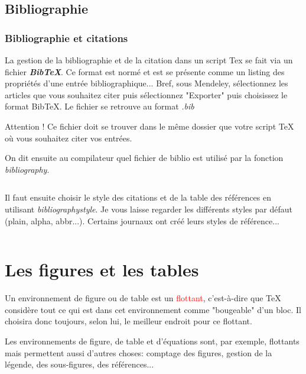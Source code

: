 \documentclass{beamer}
\begin{document}
\subsection[Biblio]{Bibliographie}
\begin{frame}[fragile]
	\frametitle{Bibliographie et citations}
	La gestion de la bibliographie et de la citation dans un script Tex se fait via un fichier \textit{\textbf{BibTeX}}. Ce format est normé et est se présente comme un listing des propriétés d'une entrée bibliographique... Bref, sous Mendeley, sélectionnez les articles que vous souhaitez citer puis sélectionnez "Exporter" puis choisissez le format BibTeX. Le fichier se retrouve au format \textit{.bib}
	\newline

	\alert{Attention !} Ce fichier doit se trouver dans le même dossier que votre script TeX où vous souhaitez citer vos entrées.
\end{frame}

\begin{frame}[fragile]
On dit ensuite au compilateur quel fichier de biblio est utilisé par la fonction \textit{bibliography}.

\begin{Verbatim}

\end{Verbatim}
\vspace{.2cm}
Il faut ensuite choisir le style des citations et de la table des références en utilisant \textit{bibliographystyle}. Je vous laisse regarder les différents styles par défaut (plain, alpha, abbr...). Certains journaux ont créé leurs styles de référence...

\begin{Verbatim}

\end{Verbatim}
\end{frame}

\section{Les figures et les tables}
\begin{frame}[fragile]

\begin{definition}
Un environnement de figure ou de table est un \textcolor{red}{flottant}, c'est-à-dire que TeX considère tout ce qui est dans cet environnement comme "bougeable" d'un bloc. Il choisira donc toujours, selon lui, le meilleur endroit pour ce flottant.
\end{definition}
\vspace{.4cm}
Les environnements de figure, de table et d'équations sont, par exemple, flottants mais permettent aussi d'autres choses: comptage des figures, gestion de la légende, des sous-figures, des références...

\end{frame}
\end{document}
